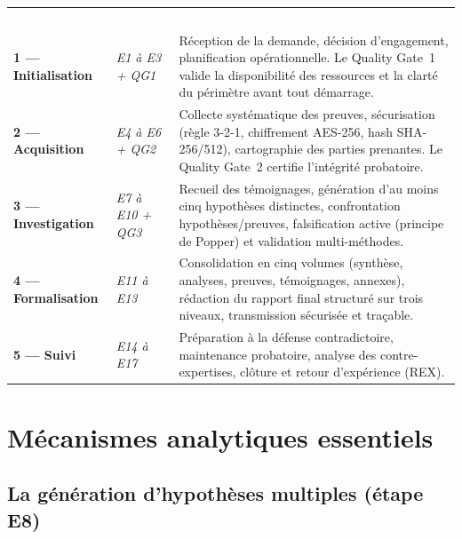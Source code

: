 \documentclass[11pt, a4paper]{article}
\begin{document}
\vspace{3pt}
\begin{tabularx}{\linewidth}{%
  >{\bfseries\small}p{3.8cm}
  >{\itshape\small}p{2.6cm}
  >{\small}X}
  \rowcolor{bleuFonce}
  \textcolor{white}{\textbf{Phase}} &
  \textcolor{white}{\textbf{\'{E}tapes}} &
  \textcolor{white}{\textbf{Contenu cl\'{e}}} \\[1pt]
  \rowcolor{white}
  1 --- Initialisation & E1 \`{a} E3 + QG1 &
    R\'{e}ception de la demande, d\'{e}cision d'engagement, planification
    op\'{e}rationnelle. Le Quality Gate~1 valide la disponibilit\'{e} des ressources
    et la clart\'{e} du p\'{e}rim\`{e}tre avant tout d\'{e}marrage. \\
  \rowcolor{bleuClair}
  2 --- Acquisition & E4 \`{a} E6 + QG2 &
    Collecte syst\'{e}matique des preuves, s\'{e}curisation (r\`{e}gle 3-2-1,
    chiffrement AES-256, hash SHA-256/512), cartographie des parties prenantes.
    Le Quality Gate~2 certifie l'int\'{e}grit\'{e} probatoire. \\
  \rowcolor{white}
  3 --- Investigation & E7 \`{a} E10 + QG3 &
    Recueil des t\'{e}moignages, g\'{e}n\'{e}ration d'au moins cinq
    hypoth\`{e}ses distinctes, confrontation hypoth\`{e}ses/preuves,
    falsification active (principe de Popper) et validation multi-m\'{e}thodes. \\
  \rowcolor{bleuClair}
  4 --- Formalisation & E11 \`{a} E13 &
    Consolidation en cinq volumes (synth\`{e}se, analyses, preuves,
    t\'{e}moignages, annexes), r\'{e}daction du rapport final structur\'{e}
    sur trois niveaux, transmission s\'{e}curis\'{e}e et tra\c{c}able. \\
  \rowcolor{white}
  5 --- Suivi & E14 \`{a} E17 &
    Pr\'{e}paration \`{a} la d\'{e}fense contradictoire, maintenance
    probatoire, analyse des contre-expertises, cl\^{o}ture et retour
    d'exp\'{e}rience (REX). \\
\end{tabularx}
\vspace{3pt}

\section{M\'{e}canismes analytiques essentiels}

\subsection{La g\'{e}n\'{e}ration d'hypoth\`{e}ses multiples (étape E8)}
\end{document}
